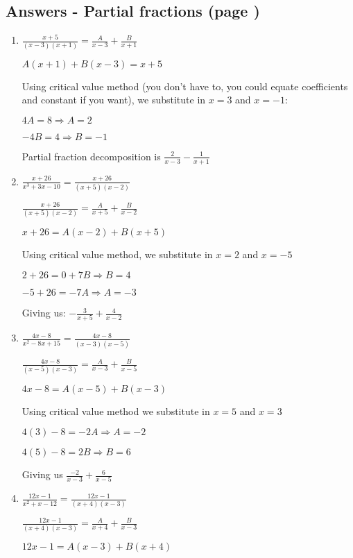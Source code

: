 \documentclass[../main.tex]{subfiles}
\begin{document}
\subsection*{Answers - Partial fractions (page \pageref{partial fractions})}
\label{Partial fractions answers}
\begin{enumerate}[itemsep=0.7cm]
    \item 
    $\frac{x+5}{(x-3)(x+1)}=\frac{A}{x-3}+\frac{B}{x+1}$

    $A(x+1)+B(x-3)=x+5$

    Using critical value method (you don't have to, you could equate coefficients and constant if you want), we substitute in $x=3$ and $x=-1$:

    $4A=8 \Rightarrow A=2$

    $-4B=4 \Rightarrow B=-1$

    Partial fraction decomposition is $\frac{2}{x-3}-\frac{1}{x+1}$

    \item 
    $\frac{x+26}{x^3+3x-10}=\frac{x+26}{(x+5)(x-2)}$

    $\frac{x+26}{(x+5)(x-2)}=\frac{A}{x+5}+\frac{B}{x-2}$

    $x+26=A(x-2)+B(x+5)$

    Using critical value method, we substitute in $x=2$ and $x=-5$

    $2+26=0+7B \Rightarrow B=4$

    $-5+26=-7A \Rightarrow A=-3$

    Giving us: $-\frac{3}{x+5}+\frac{4}{x-2}$

    \item 
    $\frac{4x-8}{x^2-8x+15}=\frac{4x-8}{(x-3)(x-5)}$

    $\frac{4x-8}{(x-5)(x-3)}=\frac{A}{x-3}+\frac{B}{x-5}$

    $4x-8=A(x-5)+B(x-3)$

    Using critical value method we substitute in $x=5$ and $x=3$

    $4(3)-8=-2A \Rightarrow A=-2$

    $4(5)-8=2B \Rightarrow B=6$

    Giving us $\frac{-2}{x-3}+\frac{6}{x-5}$

    \item 
    $\frac{12x-1}{x^2+x-12}=\frac{12x-1}{(x+4)(x-3)}$

    $\frac{12x-1}{(x+4)(x-3)}=\frac{A}{x+4}+\frac{B}{x-3}$

    $12x-1=A(x-3)+B(x+4)$


\end{enumerate}
\end{document}
